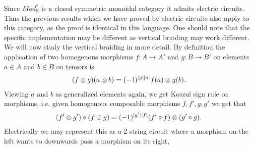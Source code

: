 \documentclass[../thesis.tex]{subfiles}
\begin{document}
            Since $Mod_\mathbb{K}^*$ is a closed symmetric monoidal category it admits electric circuits. Thus the previous results which we have proved by electric circuits also apply to this category, as the proof is identical in this language. One should note that the specific implementation may be different as vertical braiding may work different. We will now study the vertical braiding in more detail. By definition \cite{Kelly05} the application of two homogenous morphisms $f : A \rightarrow A'$ and $g : B \rightarrow B'$ on elements $a \in A$ and $b\in B$ on tensors is
            \begin{align*}
                (f\otimes g)(a\otimes b) = (-1)^{|g||a|}f(a)\otimes g(b)\tt{.}
            \end{align*}
            Viewing $a$ and $b$ as generalized elements again, we get Koszul sign rule on morphisms, i.e. given homogenous composable morphisms $f,f',g,g'$ we get that
            \begin{align*}
                (f' \otimes g')\circ(f\otimes g) = (-1)^{|g'||f|}(f'\circ f)\otimes (g'\circ g)\tt{.}
            \end{align*}
            Electrically we may represent this as a 2 string circuit where a morphism on the left wants to downwards pass a morphism on its right,
            \begin{center}
            \end{center} 
\end{document}
